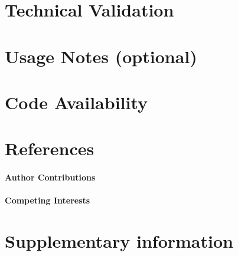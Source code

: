 \documentclass{article}
\newcommand{\fixme}[1]{{\color{red}{\bf FIXME: #1}\color{black}}}
\begin{document}
\section*{Technical Validation}

\fixme{False discovery rate curves}

\section*{Usage Notes (optional)}

\section*{Code Availability}


\section*{References}

\paragraph{Author Contributions}

\paragraph{Competing Interests}
  



\section*{Supplementary information}

\appendix
\renewcommand{\theequation}{S\arabic{equation}}
\renewcommand{\thefigure}{S\arabic{figure}}
\renewcommand{\thesection}{S\arabic{section}}
\renewcommand{\thetable}{S\arabic{table}}
\setcounter{table}{0}
\setcounter{figure}{0}
\end{document}
